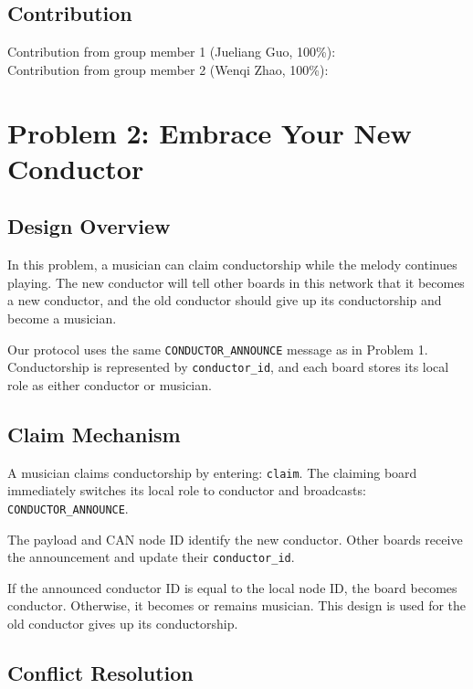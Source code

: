 \documentclass[11pt,a4paper]{article}
\begin{document}
\subsection*{Contribution}

Contribution from group member 1 (Jueliang Guo, 100\%):\\
Contribution from group member 2 (Wenqi Zhao, 100\%):

\section*{Problem 2: Embrace Your New Conductor}

\subsection*{Design Overview}

In this problem, a musician can claim conductorship while the melody continues playing. The new conductor will tell other boards in this network that it becomes a new conductor, and the old conductor should give up its conductorship and become a musician.

Our protocol uses the same \texttt{CONDUCTOR\_\allowbreak{}ANNOUNCE} message as in Problem 1. Conductorship is represented by \texttt{conductor\_\allowbreak{}id}, and each board stores its local role as either conductor or musician.

\subsection*{Claim Mechanism}

A musician claims conductorship by entering: \texttt{claim}. The claiming board immediately switches its local role to conductor and broadcasts: \texttt{CONDUCTOR\_\allowbreak{}ANNOUNCE}.

The payload and CAN node ID identify the new conductor. Other boards receive the announcement and update their \texttt{conductor\_\allowbreak{}id}.

If the announced conductor ID is equal to the local node ID, the board becomes conductor. Otherwise, it becomes or remains musician. This design is used for the old conductor gives up its conductorship.

\subsection*{Conflict Resolution}
\end{document}
